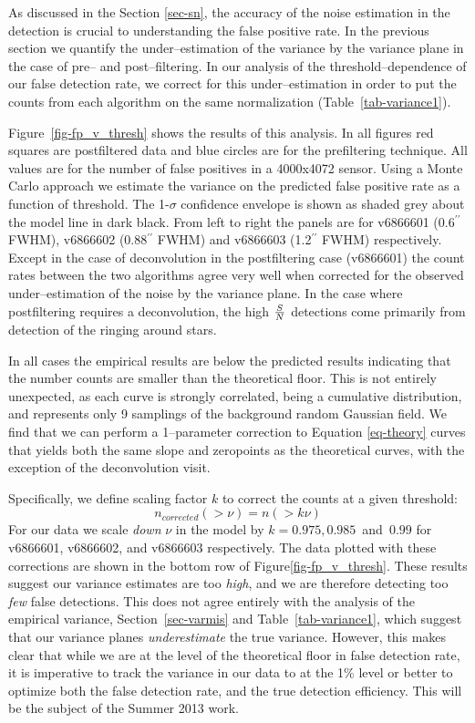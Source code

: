 \documentclass[prd, nofootinbib, floatfix, 11pt,tightenlines,times]{article}
\begin{document}
As discussed in the Section \ref{sec-sn}, the accuracy of the noise estimation in the detection is crucial to 
understanding the false positive rate.  In the previous section we quantify the under--estimation of the variance
by the variance plane in the case of pre-- and post--filtering.  In our analysis of the threshold--dependence of
our false detection rate, we correct for this under--estimation in order to put the counts from each algorithm
on the same normalization (Table~\ref{tab-variance1}).

Figure~\ref{fig-fp_v_thresh} shows the results of this analysis.  In all figures red squares are postfiltered data and
blue circles are for the prefiltering technique.  All values are for the number of false positives in a 4000x4072 sensor.
Using a Monte Carlo approach we 
estimate the variance on the predicted false positive rate as a function of threshold.  The 1-$\sigma$ confidence envelope is shown
as shaded grey about the model line in dark black.  From left to right the panels are for v6866601 (0.6$^{\prime\prime}$ FWHM),
v6866602 (0.88$^{\prime\prime}$ FWHM) and v6866603 (1.2$^{\prime\prime}$ FWHM) respectively.  Except in the case of deconvolution
in the postfiltering case (v6866601) the count rates between the two algorithms agree very well when corrected for the
observed under--estimation of the noise by the variance plane.  In the case where postfiltering requires a deconvolution, the high ${S}\over{N}$
detections come primarily from detection of the ringing around stars.

In all cases the empirical results are below the predicted results indicating
that the number counts are smaller than the theoretical floor.  This is not entirely unexpected, as each
curve is strongly correlated, being a cumulative distribution, and represents only 9 samplings of the
background random Gaussian field.  We find that we can perform a 1--parameter correction to Equation \ref{eq-theory}
curves that
yields both the same slope and zeropoints as the theoretical curves, with the exception of the deconvolution 
visit.  

Specifically, we define scaling factor $k$ to correct the counts at a given threshold:
\begin{equation}
n_{corrected}(>\nu) = n(> k\nu)
\label{correction}
\end{equation}  
For our data we scale {\it down} $\nu$ in the model by $k = 0.975, 0.985 $~and~$ 0.99$ for 
v6866601, v6866602, and v6866603 respectively.  The data plotted with these corrections are shown
in the bottom row of Figure\ref{fig-fp_v_thresh}.  These results suggest our variance estimates 
are too {\it high}, and we are therefore detecting too {\it few} false detections.  This does not agree 
entirely with the analysis of the empirical variance, Section~\ref{sec-varmis} and Table~\ref{tab-variance1}, 
which suggest that our variance planes {\it underestimate} the true variance.  However, this makes clear that 
while we are at the level of the theoretical floor in false detection rate, it is imperative to track the 
variance in our data to at the 1\% level or better to optimize both the false detection rate, and the true detection
efficiency. This will be the subject of the Summer 2013 work.
\end{document}

